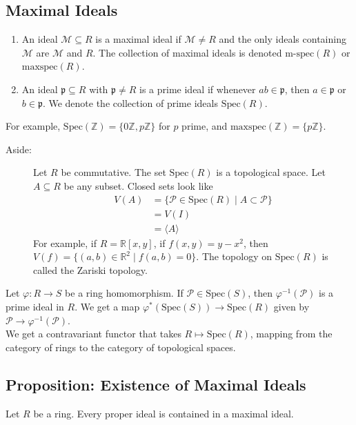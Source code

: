 \documentclass[8pt]{extarticle}
\newcommand{\Z}{\mathbb{Z}}
\newcommand{\R}{\mathbb{R}}
\begin{document}
  \subsection{Maximal Ideals}%
  \begin{enumerate}[(1)]
    \item An ideal $\mathcal{M}\subseteq R$ is a maximal ideal if $\mathcal{M}\neq R$ and the only ideals containing $\mathcal{M}$ are $\mathcal{M}$ and $R$. The collection of maximal ideals is denoted $\text{m-spec}(R)$ or $\text{maxspec}(R)$.
    \item An ideal $\mathfrak{p}\subseteq R$ with $\mathfrak{p} \neq R$ is a prime ideal if whenever $ab \in \mathfrak{p}$, then $a\in \mathfrak{p}$ or $b\in \mathfrak{p}$. We denote the collection of prime ideals $\text{Spec}(R)$.
  \end{enumerate}
  For example, $\text{Spec}(\Z) = \{0\Z,p\Z\}$ for $p$ prime, and $\text{maxspec}(\Z) = \{p\Z\}$.
  \begin{description}
    \item[Aside:] Let $R$ be commutative. The set $\text{Spec}(R)$ is a topological space. Let $A\subseteq R$ be any subset. Closed sets look like
      \begin{align*}
        V(A) &= \{\mathcal{P}\in \text{Spec}(R) \mid A \subset \mathcal{P}\}\\
             &= V(I)\\
             &= \langle A \rangle
      \end{align*}
      For example, if $R = \R[x,y]$, if $f(x,y) = y-x^2$, then $V(f) = \{(a,b)\in \R^2\mid f(a,b) = 0\}$. The topology on $\text{Spec}(R)$ is called the Zariski topology.
  \end{description}
  Let $\varphi: R\rightarrow S$ be a ring homomorphism. If $\mathcal{P}\in \text{Spec}(S)$, then $\varphi^{-1}(\mathcal{P})$ is a prime ideal in $R$. We get a map $\varphi^{\ast}(\text{Spec}(S)) \rightarrow \text{Spec}(R)$ given by $\mathcal{P}\rightarrow \varphi^{-1}(\mathcal{P})$.\\

  We get a contravariant functor that takes $R\mapsto \text{Spec}(R)$, mapping from the category of rings to the category of topological spaces. 
  \subsection{Proposition: Existence of Maximal Ideals}%
  Let $R$ be a ring. Every proper ideal is contained in a maximal ideal.\\
\end{document}
